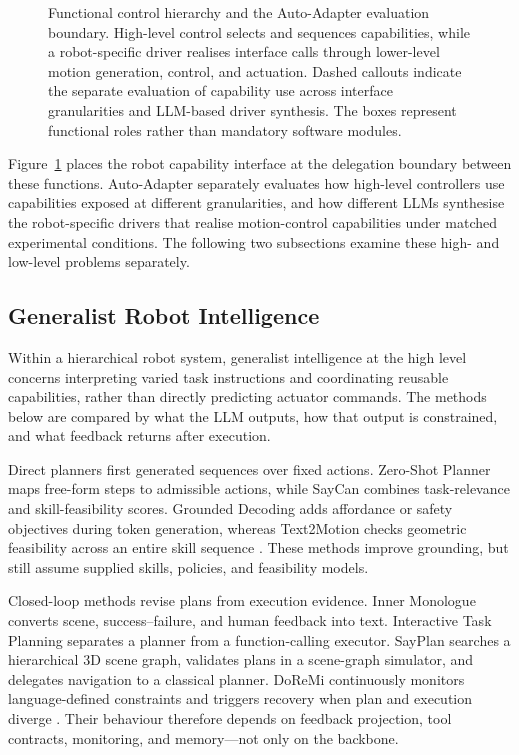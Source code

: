 \begin{figure}[tbp]
  \centering
  \fbox{\rule{0pt}{0.28\textheight}\rule{0.90\linewidth}{0pt}}
  \caption{Functional control hierarchy and the Auto-Adapter evaluation
  boundary. High-level control selects and sequences capabilities, while a
  robot-specific driver realises interface calls through lower-level motion
  generation, control, and actuation. Dashed callouts indicate the separate
  evaluation of capability use across interface granularities and LLM-based
  driver synthesis. The boxes represent functional roles rather than mandatory
  software modules.}
  \label{fig:control-hierarchy-autoadapter}
\end{figure}

Figure~\ref{fig:control-hierarchy-autoadapter} places the robot capability
interface at the delegation boundary between these functions. Auto-Adapter
separately evaluates how high-level controllers use capabilities exposed at
different granularities, and how different LLMs synthesise the robot-specific
drivers that realise motion-control capabilities under matched experimental
conditions. The following two subsections examine these high- and low-level
problems separately.

\subsection{Generalist Robot Intelligence}
\label{sec:generalist-robot-intelligence}

Within a hierarchical robot system, generalist intelligence at the high level
concerns interpreting varied task instructions and coordinating reusable
capabilities, rather than directly predicting actuator commands. The methods
below are compared by what the LLM outputs, how that output is constrained,
and what feedback returns after execution.

Direct planners first generated sequences over fixed actions. Zero-Shot
Planner maps free-form steps to admissible actions, while SayCan combines
task-relevance and skill-feasibility scores. Grounded Decoding adds affordance
or safety objectives during token generation, whereas Text2Motion checks
geometric feasibility across an entire skill sequence
\citep{huang2022zeroshotplanner,ahn2022saycan,
huang2023groundeddecoding,lin2023text2motion}. These methods improve
grounding, but still assume supplied skills, policies, and feasibility models.

Closed-loop methods revise plans from execution evidence. Inner Monologue
converts scene, success--failure, and human feedback into text. Interactive
Task Planning separates a planner from a function-calling executor. SayPlan
searches a hierarchical 3D scene graph, validates plans in a scene-graph
simulator, and delegates navigation to a classical planner. DoReMi continuously
monitors language-defined constraints and triggers recovery when plan and
execution diverge
\citep{huang2023innermonologue,li2025interactiveplanning,
rana2023sayplan,guo2024doremi}. Their behaviour therefore depends on feedback
projection, tool contracts, monitoring, and memory---not only on the backbone.

